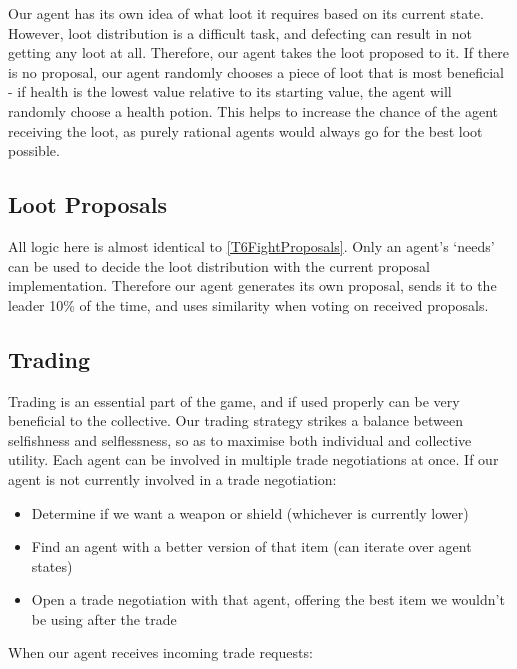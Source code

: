Our agent has its own idea of what loot it requires based on its current state. However, loot distribution is a difficult task, and defecting can result in not getting any loot at all. Therefore, our agent takes the loot proposed to it. If there is no proposal, our agent randomly chooses a piece of loot that is most beneficial - if health is the lowest value relative to its starting value, the agent will randomly choose a health potion. This helps to increase the chance of the agent receiving the loot, as purely rational agents would always go for the best loot possible.

\subsection{Loot Proposals}

All logic here is almost identical to \ref{T6FightProposals}. Only an agent's `needs' can be used to decide the loot distribution with the current proposal implementation. Therefore our agent generates its own proposal, sends it to the leader 10\% of the time, and uses similarity when voting on received proposals.

\subsection{Trading}

Trading is an essential part of the game, and if used properly can be very beneficial to the collective. Our trading strategy strikes a balance between selfishness and selflessness, so as to maximise both individual and collective utility. Each agent can be involved in multiple trade negotiations at once.
If our agent is not currently involved in a trade negotiation:

\begin{itemize}
    \item Determine if we want a weapon or shield (whichever is currently lower)
    \item Find an agent with a better version of that item (can iterate over agent states)
    \item Open a trade negotiation with that agent, offering the best item we wouldn't be using after the trade
\end{itemize}
When our agent receives incoming trade requests:

